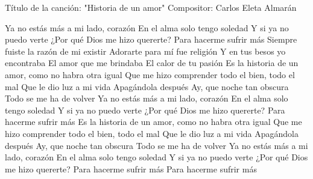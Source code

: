 Título de la canción: "Historia de un amor"
Compositor: Carlos Eleta Almarán 

Ya no estás más a mi lado, corazón
En el alma solo tengo soledad
Y si ya no puedo verte
¿Por qué Dios me hizo quererte?
Para hacerme sufrir más
Siempre fuiste la razón de mi existir
Adorarte para mí fue religión
Y en tus besos yo encontraba
El amor que me brindaba
El calor de tu pasión
Es la historia de un amor, como no habra otra igual
Que me hizo comprender todo el bien, todo el mal
Que le dio luz a mi vida
Apagándola después
Ay, que noche tan obscura
Todo se me ha de volver
Ya no estás más a mi lado, corazón
En el alma solo tengo soledad
Y si ya no puedo verte
¿Por qué Dios me hizo quererte?
Para hacerme sufrir más
Es la historia de un amor, como no habra otra igual
Que me hizo comprender todo el bien, todo el mal
Que le dio luz a mi vida
Apagándola después
Ay, que noche tan obscura
Todo se me ha de volver
Ya no estás más a mi lado, corazón
En el alma solo tengo soledad
Y si ya no puedo verte
¿Por qué Dios me hizo quererte?
Para hacerme sufrir más
Para hacerme sufrir más